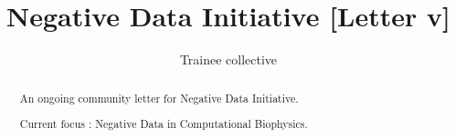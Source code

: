 \documentclass[9pt,lessons]{livecoms}
\title{Negative Data Initiative [Letter v\versionnumber]}
\author[1*]{Trainee collective}
\theoremstyle{definition}
\theoremstyle{remark}
\begin{document}
\begin{frontmatter}

\maketitle

\begin{abstract}
   An ongoing community letter for Negative Data Initiative. 

   Current focus : Negative Data in Computational Biophysics. 
\end{abstract}

\end{frontmatter}


\end{document}
